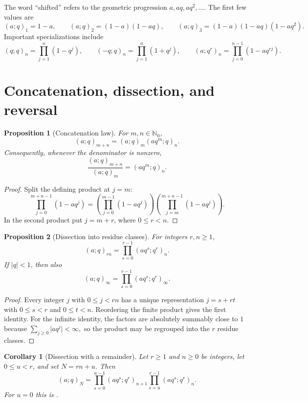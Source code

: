 \documentclass[11pt,oneside,openany]{book}
\newtheorem{proposition}[proposition]{Proposition}
\newtheorem{corollary}[corollary]{Corollary}
\theoremstyle{definition}
\theoremstyle{remark}
\newcommand{\N}{\mathbb N}
\newcommand{\abs}[1]{\lvert #1\rvert}
\begin{document}
The word ``shifted'' refers to the geometric progression $a,aq,aq^2,\ldots$.  The first few values are
\[
 (a;q)_1=1-a,
 \qquad
 (a;q)_2=(1-a)(1-aq),
 \qquad
 (a;q)_3=(1-a)(1-aq)(1-aq^2).
\]
Important specializations include
\[
 (q;q)_n=\prod_{j=1}^n(1-q^j),
 \qquad
 (-q;q)_n=\prod_{j=1}^n(1+q^j),
 \qquad
 (a;q^r)_n=\prod_{j=0}^{n-1}(1-aq^{rj}).
\]

\section{Concatenation, dissection, and reversal}

\begin{proposition}[Concatenation law]\label{prop:concat}
For $m,n\in\N_0$,
\[
 (a;q)_{m+n}=(a;q)_m(aq^m;q)_n.
\]
Consequently, whenever the denominator is nonzero,
\[
 \frac{(a;q)_{m+n}}{(a;q)_m}=(aq^m;q)_n.
\]
\end{proposition}

\begin{proof}
Split the defining product at $j=m$:
\[
 \prod_{j=0}^{m+n-1}(1-aq^j)
 =\left(\prod_{j=0}^{m-1}(1-aq^j)\right)
  \left(\prod_{j=m}^{m+n-1}(1-aq^j)\right).
\]
In the second product put $j=m+r$, where $0\le r<n$.
\end{proof}

\begin{proposition}[Dissection into residue classes]\label{prop:dissection}
For integers $r,n\ge1$,
\[
 (a;q)_{rn}=\prod_{s=0}^{r-1}(aq^s;q^r)_n.
\]
If $\abs q<1$, then also
\[
 (a;q)_\infty=\prod_{s=0}^{r-1}(aq^s;q^r)_\infty.
\]
\end{proposition}

\begin{proof}
Every integer $j$ with $0\le j<rn$ has a unique representation $j=s+rt$ with $0\le s<r$ and $0\le t<n$.  Reordering the finite product gives the first identity.  For the infinite identity, the factors are absolutely summably close to $1$ because
\(
 \sum_{j\ge0}\abs{a q^j}<\infty,
\)
so the product may be regrouped into the $r$ residue classes.
\end{proof}

\begin{corollary}[Dissection with a remainder]\label{cor:dissection-remainder}
Let $r\ge1$ and $n\ge0$ be integers, let $0\le u<r$, and set $N=rn+u$.  Then
\[
 (a;q)_N
 =\prod_{s=0}^{u-1}(aq^s;q^r)_{n+1}
  \prod_{s=u}^{r-1}(aq^s;q^r)_n .
\]
For $u=0$ this is .
\end{corollary}
\end{document}
